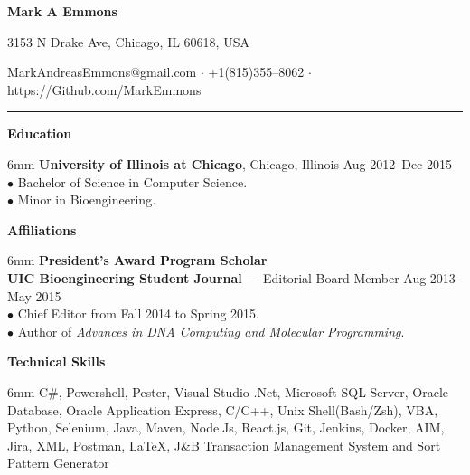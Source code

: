 \documentclass[11pt]{article}
\newcommand{\sectionheader}[1]{\noindent \textbf{\large #1}}
\newenvironment{sectionbody}{\begin{adjustwidth}{6mm}{}}{\end{adjustwidth}}
\begin{document}

\centerline{\LARGE \bf Mark A Emmons}
\centerline{3153 N Drake Ave, Chicago, IL 60618, USA}
\centerline{MarkAndreasEmmons@gmail.com $\cdot$ +1(815)355--8062 $\cdot$ https://Github.com/MarkEmmons}

\noindent\rule{16.5cm}{0.4pt}

\sectionheader{Education}
\begin{sectionbody}
{\bf University of Illinois at Chicago}, Chicago, Illinois \hfill Aug 2012--Dec 2015 \\
$\bullet$ Bachelor of Science in Computer Science. \\
$\bullet$ Minor in Bioengineering. \\
\end{sectionbody}

\vspace{1mm}

\sectionheader{Affiliations}
\begin{sectionbody}
{\bf President's Award Program Scholar} \\
{\bf UIC Bioengineering Student Journal} --- Editorial Board Member \hfill Aug 2013--May 2015 \\
$\bullet$ Chief Editor from Fall 2014 to Spring 2015. \\
$\bullet$ Author of {\it Advances in DNA Computing and Molecular Programming}. \\
\end{sectionbody}

\vspace{1mm}

\sectionheader{Technical Skills}
\begin{sectionbody}
C\#, Powershell, Pester, Visual Studio .Net, Microsoft SQL Server, Oracle Database, Oracle Application Express, C/C++, Unix Shell(Bash/Zsh), VBA, Python, Selenium, Java, Maven, Node.Js, React.js, Git, Jenkins, Docker, AIM, Jira, XML, Postman, \LaTeX, J\&B Transaction Management System and Sort Pattern Generator \\
\end{sectionbody}

\vspace{1mm}
\end{document}
